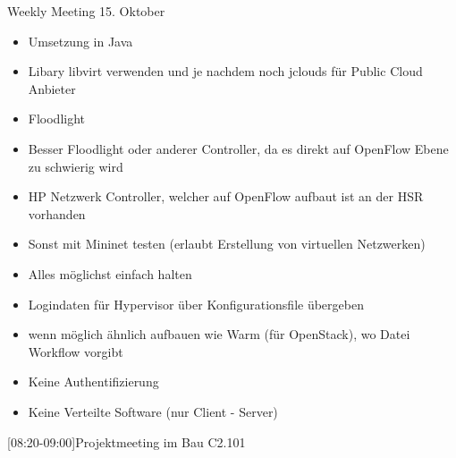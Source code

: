 \begin{Protokoll}{Weekly Meeting 15. Oktober}
\protokollKopf

\begin{itemize}
  \item Umsetzung in Java
  \item Libary libvirt verwenden und je nachdem noch jclouds für Public Cloud 
  Anbieter
\end{itemize}

\begin{itemize}
  \item Floodlight
  \item Besser Floodlight oder anderer Controller, da es direkt auf OpenFlow Ebene zu schwierig wird
  \item HP Netzwerk Controller, welcher auf OpenFlow aufbaut ist an der HSR 
  vorhanden
  \item Sonst mit Mininet testen (erlaubt Erstellung von virtuellen Netzwerken) 
\end{itemize}

\begin{itemize}
  \item Alles möglichst einfach halten
  \item Logindaten für Hypervisor über Konfigurationsfile übergeben
\end{itemize}

\begin{itemize}
  \item wenn möglich ähnlich aufbauen wie Warm (für OpenStack), wo Datei 
  Workflow vorgibt
\end{itemize}

\begin{itemize}
	\item Keine Authentifizierung
	\item Keine Verteilte Software (nur Client - Server)
\end{itemize}

[08:20-09:00]{Projektmeeting im Bau C2.101}

\end{Protokoll}
